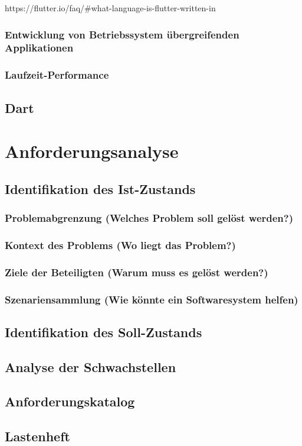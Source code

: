 \documentclass{scrreprt}
\begin{document}
https://flutter.io/faq/#what-language-is-flutter-written-in

\subsection{Entwicklung von Betriebssystem übergreifenden Applikationen}
\subsection{Laufzeit-Performance}
\section{Dart}
\chapter{Anforderungsanalyse}
\section{Identifikation des Ist-Zustands}
\subsection{Problemabgrenzung (Welches Problem soll gelöst werden?)}
\subsection{Kontext des Problems (Wo liegt das Problem?)}
\subsection{Ziele der Beteiligten (Warum muss es gelöst werden?)}
\subsection{Szenariensammlung (Wie könnte ein Softwaresystem helfen)}
\section{Identifikation des Soll-Zustands}
\section{Analyse der Schwachstellen}
\section{Anforderungskatalog}
\section{Lastenheft}
\end{document}
